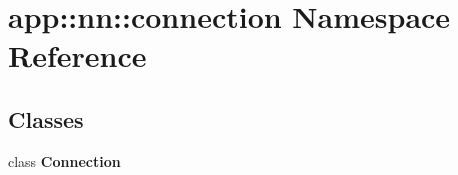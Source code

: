 \section{app::nn::connection Namespace Reference}
\label{namespaceapp_1_1nn_1_1connection}


\subsection*{Classes}
\begin{CompactItemize}
\item 
class {\bf Connection}
\end{CompactItemize}
